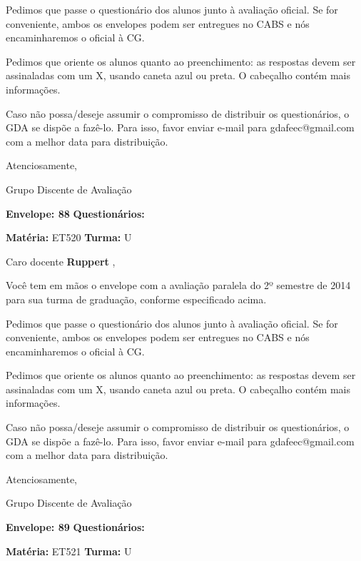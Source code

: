 \documentclass[a5paper]{letter}
\begin{document}
	Pedimos que passe o questionário dos alunos junto à avaliação oficial. Se for conveniente, ambos os envelopes podem ser entregues no CABS e nós encaminharemos o oficial à CG.

Pedimos que oriente os alunos quanto ao preenchimento: as respostas devem ser assinaladas com um X, usando caneta azul ou preta. O cabeçalho contém mais informações.

	Caso não possa/deseje assumir o compromisso de distribuir os questionários, o GDA se dispõe a fazê-lo. Para isso, favor enviar e-mail para gdafeec@gmail.com com a melhor data para distribuição.


Atenciosamente, 

Grupo Discente de Avaliação

\vspace{0.5cm}

{\bf Envelope: 88 }		\hfill	{\bf Questionários:} \hspace{2cm}

\newpage
\thispagestyle{empty}

\hfill {\bf Matéria:} ET520 {\bf Turma:} U

Caro docente {\bf Ruppert }, 

	Você tem em mãos o envelope com a avaliação paralela do 2º semestre de 2014 para sua turma de graduação, conforme especificado acima.

	Pedimos que passe o questionário dos alunos junto à avaliação oficial. Se for conveniente, ambos os envelopes podem ser entregues no CABS e nós encaminharemos o oficial à CG.

Pedimos que oriente os alunos quanto ao preenchimento: as respostas devem ser assinaladas com um X, usando caneta azul ou preta. O cabeçalho contém mais informações.

	Caso não possa/deseje assumir o compromisso de distribuir os questionários, o GDA se dispõe a fazê-lo. Para isso, favor enviar e-mail para gdafeec@gmail.com com a melhor data para distribuição.


Atenciosamente, 

Grupo Discente de Avaliação

\vspace{0.5cm}

{\bf Envelope: 89 }		\hfill	{\bf Questionários:} \hspace{2cm}

\newpage
\thispagestyle{empty}

\hfill {\bf Matéria:} ET521 {\bf Turma:} U
\end{document}
